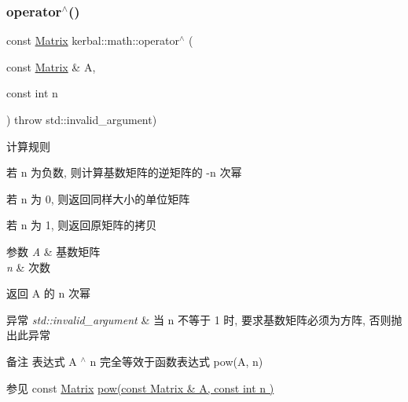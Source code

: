 \subsubsection{\texorpdfstring{operator$^\wedge$()}{operator^()}}
{\footnotesize\ttfamily const \hyperlink{classkerbal_1_1math_1_1_matrix}{Matrix} kerbal\+::math\+::operator$^\wedge$ (\begin{DoxyParamCaption}\item[{const \hyperlink{classkerbal_1_1math_1_1_matrix}{Matrix} \&}]{A,  }\item[{const int}]{n }\end{DoxyParamCaption}) throw  std\+::invalid\+\_\+argument) }

\begin{DoxyParagraph}{计算规则}

\begin{DoxyItemize}
\item 若 n 为负数, 则计算基数矩阵的逆矩阵的 -\/n 次幂~\newline

\item 若 n 为 0, 则返回同样大小的单位矩阵~\newline

\item 若 n 为 1, 则返回原矩阵的拷贝 
\end{DoxyItemize}
\end{DoxyParagraph}

\begin{DoxyParams}{参数}
{\em A} & 基数矩阵 \\
\hline
{\em n} & 次数 \\
\hline
\end{DoxyParams}
\begin{DoxyReturn}{返回}
A 的 n 次幂 
\end{DoxyReturn}

\begin{DoxyExceptions}{异常}
{\em std\+::invalid\+\_\+argument} & 当 n 不等于 1 时, 要求基数矩阵必须为方阵, 否则抛出此异常 \\
\hline
\end{DoxyExceptions}
\begin{DoxyRemark}{备注}
表达式 A $^\wedge$ n 完全等效于函数表达式 pow(\+A, n) 
\end{DoxyRemark}
\begin{DoxySeeAlso}{参见}
const \hyperlink{classkerbal_1_1math_1_1_matrix}{Matrix} \hyperlink{namespacekerbal_1_1math_a86b959cd43a4fe7ed04f513d67189acd}{pow(const Matrix \& A, const int n )} 
\end{DoxySeeAlso}
\mbox{\label{namespacekerbal_1_1math_a51f431f1f41e3bda5fe59a6854c3d3f7}} 
